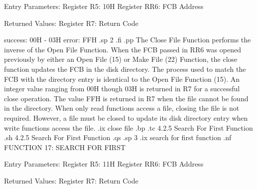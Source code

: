              Entry Parameters:
                Register   R5:  10H
                Register  RR6:  FCB Address

             Returned  Values:
                Register   R7:  Return Code

                                success:  00H - 03H
                                  error:  FFH
.sp 2
.fi
.pp
The Close File Function performs the inverse of the Open File
Function.  When the FCB passed in  RR6 was opened previously by either
an Open File (15) or Make File (22) Function, the close function
updates the FCB in the disk directory. The
process used to match the FCB with the directory entry is
identical to the Open File Function (15).  An integer value
ranging from 00H though 03H is returned in   R7 for a successful
close operation. The value FFH is returned in   R7 when the file
cannot be found in the directory. When only read functions access
a file, closing the file is not required. However, a file must be
closed to update its disk directory entry when write functions access the 
file. 
.ix close file
.bp
.tc         4.2.5  Search For First Function
.sh
4.2.5  Search For First Function
.qs
.sp 3
.ix search for first function
.nf
                 FUNCTION 17:  SEARCH FOR FIRST

             Entry Parameters:
                Register   R5:  11H
                Register  RR6:  FCB Address

             Returned  Values:
                Register   R7:  Return Code

